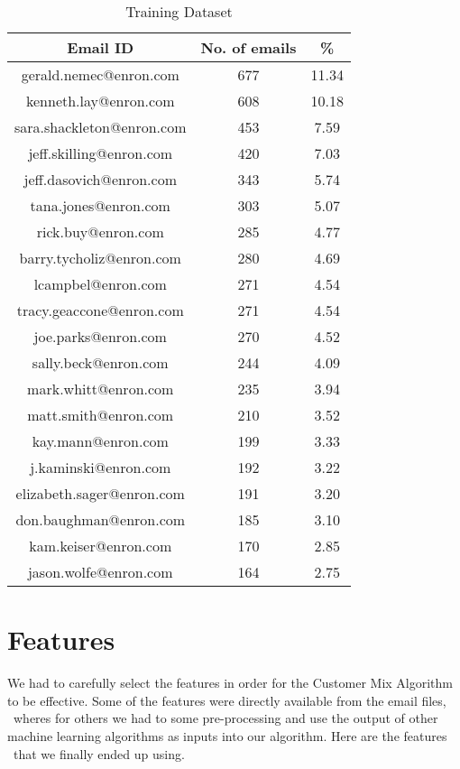 \documentclass[senior,oneside]{UIUC}
\begin{document}
\begin{table}[!ht]
\center
\begin{tabular}{c c c }
\hline \hline
Email ID & No. of emails & \% \\
\hline
gerald.nemec@enron.com & 677 & 11.34 \\
kenneth.lay@enron.com & 608 & 10.18 \\
sara.shackleton@enron.com & 453 & 7.59 \\
jeff.skilling@enron.com & 420 & 7.03 \\
jeff.dasovich@enron.com & 343 & 5.74 \\
tana.jones@enron.com & 303 & 5.07 \\
rick.buy@enron.com & 285 & 4.77 \\
barry.tycholiz@enron.com & 280 & 4.69 \\
lcampbel@enron.com & 271 & 4.54 \\
tracy.geaccone@enron.com & 271 & 4.54 \\
joe.parks@enron.com & 270 & 4.52 \\
sally.beck@enron.com & 244 & 4.09 \\
mark.whitt@enron.com & 235 & 3.94 \\
matt.smith@enron.com & 210 & 3.52 \\
kay.mann@enron.com & 199 & 3.33 \\
j.kaminski@enron.com & 192 & 3.22 \\
elizabeth.sager@enron.com & 191 & 3.20 \\
don.baughman@enron.com & 185 & 3.10 \\
kam.keiser@enron.com & 170 & 2.85 \\
jason.wolfe@enron.com & 164 & 2.75 \\
\end{tabular}
\caption{Training Dataset}
\label{table:training-data}
\end{table}


\chapter{Features}
\label{chap:features}

We had to carefully select the features in order for the Customer Mix Algorithm to be effective. Some of the features were directly available from the email files, \
wheres for others we had to some pre-processing and use the output of other machine learning algorithms as inputs into our algorithm. Here are the features \
that we finally ended up using.
\end{document}
